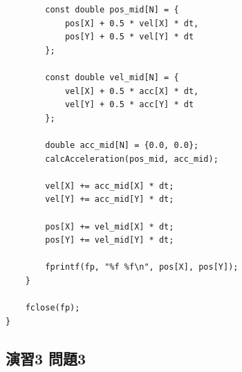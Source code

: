 \documentclass[uplatex,dvipdfmx]{jsarticle}
\begin{document}
\begin{lstlisting}
		const double pos_mid[N] = {
			pos[X] + 0.5 * vel[X] * dt,
			pos[Y] + 0.5 * vel[Y] * dt
		};

		const double vel_mid[N] = {
			vel[X] + 0.5 * acc[X] * dt,
			vel[Y] + 0.5 * acc[Y] * dt
		};

		double acc_mid[N] = {0.0, 0.0};
		calcAcceleration(pos_mid, acc_mid);

		vel[X] += acc_mid[X] * dt;
		vel[Y] += acc_mid[Y] * dt;

		pos[X] += vel_mid[X] * dt;
		pos[Y] += vel_mid[Y] * dt;

		fprintf(fp, "%f %f\n", pos[X], pos[Y]);
	}

	fclose(fp);
}
\end{lstlisting}


\subsection{演習3 問題3}
\end{document}

